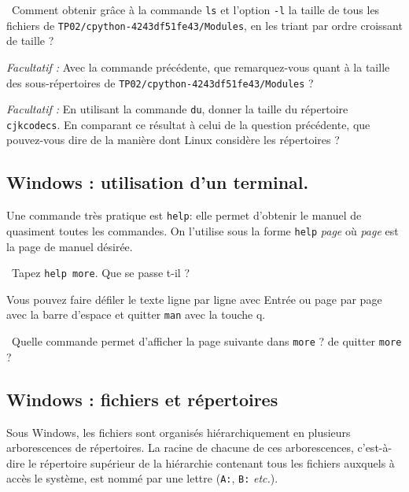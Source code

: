 \medskip

\question\ Comment obtenir grâce à la commande
\texttt{ls} et l'option \texttt{-l} la taille de tous les
fichiers de \texttt{TP02/cpython-4243df51fe43/Modules}, en les triant par ordre
croissant de taille ?

\medskip

\question{}\emph{Facultatif :} Avec la commande précédente, que remarquez-vous quant à la taille des
sous-répertoires de \texttt{TP02/cpython-4243df51fe43/Modules} ?

\medskip

\question{}\emph{Facultatif :} En utilisant la commande \texttt{du}, donner la taille du répertoire
\texttt{cjkcodecs}. En comparant ce résultat à celui de la question
précédente, que pouvez-vous dire de la manière dont Linux considère les
répertoires ?

\subsection{Windows : utilisation d'un terminal.}  \label{tp02:sec:win1}

Une commande très pratique est \texttt{help}: elle permet d'obtenir le
manuel de quasiment toutes les commandes. On l'utilise sous la
forme \texttt{help} \textit{page} où \textit{page} est la page de
manuel désirée.

\medskip

\question\ Tapez \texttt{help more}. Que se passe t-il ?

\medskip

Vous pouvez faire défiler le texte ligne par ligne avec Entrée ou page
par page avec la barre d'espace et quitter \texttt{man} avec la touche
q.

\medskip

\question\ Quelle commande permet d'afficher la page suivante dans \texttt{more} ? de quitter \texttt{more} ? 

\subsection{Windows : fichiers et répertoires} \label{tp02:sec:win2}

Sous Windows, les fichiers sont organisés hiérarchiquement en plusieurs arborescences de
répertoires. La racine de chacune de ces arborescences, c'est-à-dire le
répertoire supérieur de la hiérarchie contenant tous les fichiers
auxquels à accès le système, est nommé par une lettre (\texttt{A:}, \texttt{B:} \textit{etc.}). 

